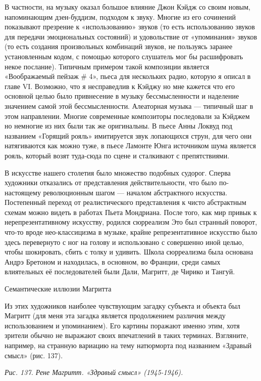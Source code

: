 \documentclass[../main.tex]{subfiles}
\begin{document}
В частности, на музыку оказал большое влияние Джон Кэйдж со своим новым, напоминающим дзен-буддизм, подходом к звуку. Многие из его сочинений показывают презрение к «использованию» звуков (то есть использованию звуков для передачи эмоциональных состояний) и удовольствие от «упоминания» звуков (то есть создания произвольных комбинаций звуков, не пользуясь заранее установленным кодом, с помощью которого слушатель мог бы расшифровать некое послание). Типичным примером такой композиции является «Воображаемый пейзаж \# 4», пьеса для нескольких радио, которую я описал в главе VI. Возможно, что я несправедлив к Кэйджу но мне кажется что его основной целью было привнесение в музыку бессмысленности и наделение значением самой этой бессмысленности. Алеаторная музыка --- типичный шаг в этом направлении. Многие современные композиторы последовали за Кэйджем но немногие из них были так же оригинальны. В пьесе Анны Локвуд под названием «Горящий рояль» имитируется звук лопающихся струн, для чего они натягиваются как можно туже, в пьесе Ламонте Юнга источником шума является рояль, который возят туда-сюда по сцене и сталкивают с препятствиями.

В искусстве нашего столетия было множество подобных судорог. Сперва художники отказались от представления действительности, что было по-настоящему революционным шагом --- началом абстрактного искусства. Постепенный переход от реалистического представления к чисто абстрактным схемам можно видеть в работах Пьета Мондриана. После того, как мир привык к нерепрезентативному искусству, родился сюрреализм Это был странный поворот, что-то вроде нео-классицизма в музыке, крайне репрезентативное искусство было здесь перевернуто с ног на голову и использовано с совершенно иной целью, чтобы шокировать, сбить с толку и удивить. Школа сюрреализма была основана Андрэ Бретоном и находилась, в основном, во Франции, среди самых влиятельных её последователей были Дали, Магритт, де Чирико и Тангуй.

Семантические иллюзии Магритта

Из этих художников наиболее чувствующим загадку субъекта и объекта был Магритт (для меня эта загадка является продолжением различия между использованием и упоминанием). Его картины поражают именно этим, хотя зрители обычно не выражают своих впечатлений в таких терминах. Взгляните, например, на странную вариацию на тему натюрморта под названием «Здравый смысл» (рис. 137).

\emph{Рис. 137. Рене Магритт. «Здравый смысл» (1945-1946).}
\end{document}
